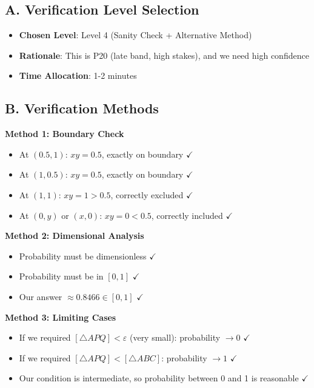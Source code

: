 \documentclass[11pt]{article}
\begin{document}
\begin{verificationbox}
\subsection*{A. Verification Level Selection}
\begin{itemize}[leftmargin=*]
    \item \textbf{Chosen Level}: Level 4 (Sanity Check + Alternative Method)
    \item \textbf{Rationale}: This is P20 (late band, high stakes), and we need high confidence
    \item \textbf{Time Allocation}: 1-2 minutes
\end{itemize}

\subsection*{B. Verification Methods}

\textbf{Method 1: Boundary Check}
\begin{itemize}
    \item At $(0.5, 1)$: $xy = 0.5$, exactly on boundary $\checkmark$
    \item At $(1, 0.5)$: $xy = 0.5$, exactly on boundary $\checkmark$
    \item At $(1, 1)$: $xy = 1 > 0.5$, correctly excluded $\checkmark$
    \item At $(0, y)$ or $(x, 0)$: $xy = 0 < 0.5$, correctly included $\checkmark$
\end{itemize}

\textbf{Method 2: Dimensional Analysis}
\begin{itemize}
    \item Probability must be dimensionless $\checkmark$
    \item Probability must be in $[0, 1]$ $\checkmark$
    \item Our answer $\approx 0.8466 \in [0,1]$ $\checkmark$
\end{itemize}

\textbf{Method 3: Limiting Cases}
\begin{itemize}
    \item If we required $[\triangle APQ] < \varepsilon$ (very small): probability $\to 0$ $\checkmark$
    \item If we required $[\triangle APQ] < [\triangle ABC]$: probability $\to 1$ $\checkmark$
    \item Our condition is intermediate, so probability between 0 and 1 is reasonable $\checkmark$
\end{itemize}


\end{verificationbox}
\end{document}
